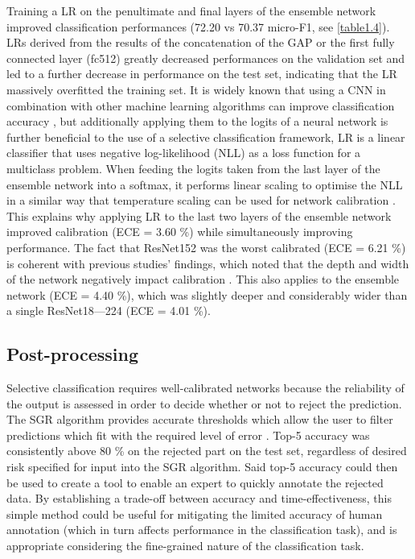 Training a LR on the penultimate and final layers of the ensemble network improved classification performances (72.20 vs 70.37 micro-F1, see \autoref{table1.4}). LRs derived from the results of the concatenation of the GAP or the first fully connected layer (fc512) greatly decreased performances on the validation set and led to a further decrease in performance on the test set, indicating that the LR massively overfitted the training set. It is widely known that using a CNN in combination with other machine learning algorithms can improve classification accuracy \citep{donahue_decaf:_2014, gao_combining_2017, huang_densely_2017, li_visual_2016}, but additionally applying them to the logits of a neural network is further beneficial to the use of a selective classification framework, LR is a linear classifier that uses negative log-likelihood (NLL) as a loss function for a multiclass problem. When feeding the logits taken from the last layer of the ensemble network into a softmax, it performs linear scaling to optimise the NLL in a similar way that temperature scaling can be used for network calibration \citep{guo_calibration_2017}. This explains why applying LR to the last two layers of the ensemble network improved calibration (ECE = 3.60 \%) while simultaneously improving performance. The fact that ResNet152 was the worst calibrated (ECE = 6.21 \%) is coherent with previous studies’ findings, which noted that the depth and width of the network negatively impact calibration \citep{guo_calibration_2017}. This also applies to the ensemble network (ECE = 4.40 \%), which was slightly deeper and considerably wider than a single ResNet18---224 (ECE = 4.01 \%).

\subsection{Post-processing}\label{chapitre1_7.3}
Selective classification requires well-calibrated networks because the reliability of the output is assessed in order to decide whether or not to reject the prediction. The SGR algorithm provides accurate thresholds which allow the user to filter predictions which fit with the required level of error \citep{geifman_selective_2017}. Top-5 accuracy was consistently above 80 \% on the rejected part on the test set, regardless of desired risk specified for input into the SGR algorithm. Said top-5 accuracy could then be used to create a tool to enable an expert to quickly annotate the rejected data. By establishing a trade-off between accuracy and time-effectiveness, this simple method could be useful for mitigating the limited accuracy of human annotation (which in turn affects performance in the classification task), and is appropriate considering the fine-grained nature of the classification task.

